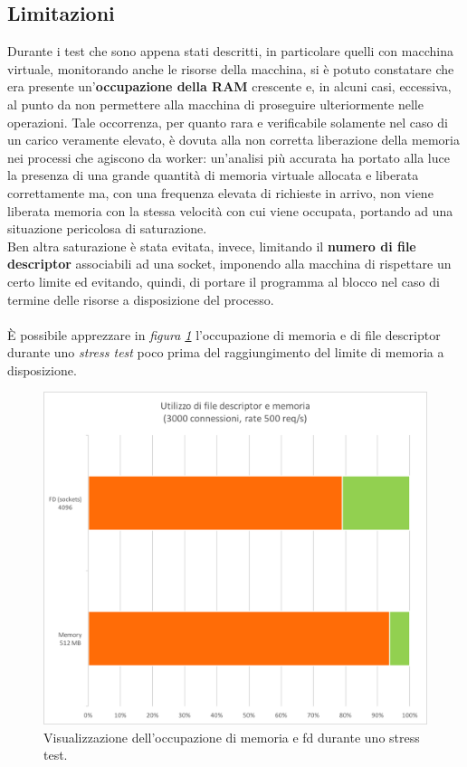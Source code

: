\documentclass[italian]{tktltiki2}
\begin{document}
\subsection{Limitazioni}
Durante i test che sono appena stati descritti, in particolare quelli con macchina virtuale, monitorando anche le risorse della macchina, si è potuto constatare che era presente un'\textbf{occupazione della RAM} crescente e, in alcuni casi, eccessiva, al punto da non permettere alla macchina di proseguire ulteriormente nelle operazioni. Tale occorrenza, per quanto rara e verificabile solamente nel caso di un carico veramente elevato, è dovuta alla non corretta liberazione della memoria nei processi che agiscono da worker: un'analisi più accurata ha portato alla luce la presenza di una grande quantità di memoria virtuale allocata e liberata correttamente ma, con una frequenza elevata di richieste in arrivo, non viene liberata memoria con la stessa velocità con cui viene occupata, portando ad una situazione pericolosa di saturazione. 
\\
Ben altra saturazione è stata evitata, invece, limitando il \textbf{numero di file descriptor} associabili ad una socket, imponendo alla macchina di rispettare un certo limite ed evitando, quindi, di portare il programma al blocco nel caso di termine delle risorse a disposizione del processo. 
\\
\\
È possibile apprezzare in \emph{figura \ref{fig: fd_memory}} l'occupazione di memoria e di file descriptor durante uno \emph{stress test} poco prima del raggiungimento del limite di memoria a disposizione. 
\begin{figure}[H]
\centering
\includegraphics[width=\textwidth]{images/fd_memory}
\caption{Visualizzazione dell'occupazione di memoria e fd durante uno stress test.\label{fig: fd_memory}}
\end{figure}
\end{document}
